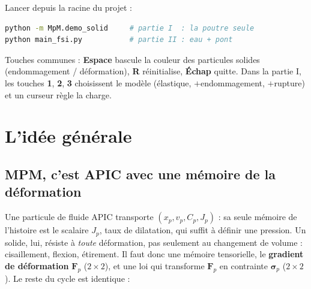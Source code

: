 \documentclass[11pt,a4paper]{article}
\newcommand{\bm}[1]{\boldsymbol{#1}}
\begin{document}
Lancer depuis la racine du projet :
\begin{lstlisting}[language=bash]
python -m MpM.demo_solid     # partie I  : la poutre seule
python main_fsi.py           # partie II : eau + pont
\end{lstlisting}
Touches communes : \textbf{Espace} bascule la couleur des particules solides (endommagement /
déformation), \textbf{R} réinitialise, \textbf{Échap} quitte. Dans la partie I, les touches
\textbf{1}, \textbf{2}, \textbf{3} choisissent le modèle (élastique, $+$endommagement, $+$rupture)
et un curseur règle la charge.

\section{L'idée générale}

\subsection{MPM, c'est APIC avec une mémoire de la déformation}

Une particule de fluide APIC transporte $(x_p, v_p, C_p, J_p)$ : sa seule mémoire de l'histoire
est le scalaire $J_p$, taux de dilatation, qui suffit à définir une pression. Un solide, lui,
résiste à \emph{toute} déformation, pas seulement au changement de volume : cisaillement, flexion,
étirement. Il faut donc une mémoire tensorielle, le \textbf{gradient de déformation} $\mathbf F_p$
($2\times2$), et une loi qui transforme $\mathbf F_p$ en contrainte $\bm\sigma_p$ ($2\times2$).
Le reste du cycle est identique :

\begin{center}
\end{center}
\end{document}
